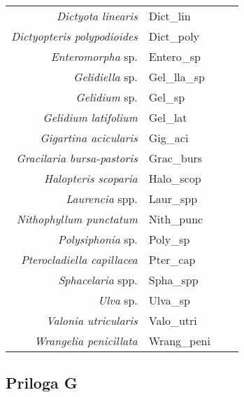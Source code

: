\begin{table}[htb]
\begin{center}
\begin{tabular}{r l r l}
\emph{Dictyota linearis} & Dict\_lin \\
\emph{Dictyopteris polypodioides} & Dict\_poly \\
\emph{Enteromorpha} sp. & Entero\_sp \\
\emph{Gelidiella} sp. & Gel\_lla\_sp \\
\emph{Gelidium} sp. & Gel\_sp \\
\emph{Gelidium latifolium} & Gel\_lat \\
\emph{Gigartina acicularis} & Gig\_aci \\
\emph{Gracilaria bursa-pastoris} & Grac\_burs \\
\emph{Halopteris scoparia} & Halo\_scop \\
\emph{Laurencia} spp. & Laur\_spp \\
\emph{Nithophyllum punctatum} & Nith\_punc \\
\emph{Polysiphonia} sp. & Poly\_sp \\
\emph{Pterocladiella capillacea} & Pter\_cap \\
\emph{Sphacelaria} spp. & Spha\_spp \\
\emph{Ulva} sp. & Ulva\_sp \\
\emph{Valonia utricularis} & Valo\_utri \\
\emph{Wrangelia penicillata} & Wrang\_peni \\
 \bottomrule
 \end{tabular}
 \end{center}
\end{table}

\newpage
\subsection*{Priloga G}

